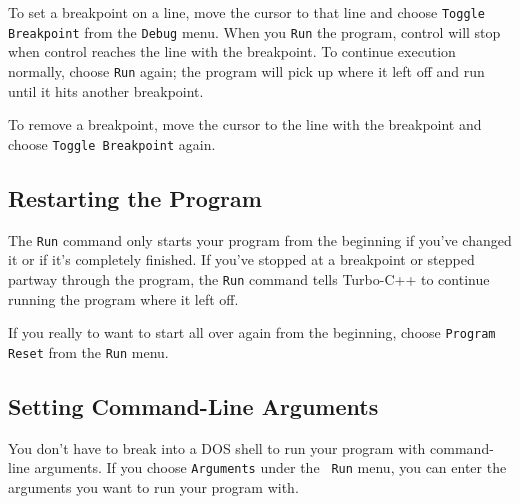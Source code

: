 To set a breakpoint on a line, move the cursor to that line and choose
{\tt Toggle Breakpoint} from the {\tt Debug} menu.  When you {\tt Run}
the program, control will stop when control reaches the line with the
breakpoint.  To continue execution normally, choose {\tt Run} again; the
program will pick up where it left off and run until it hits another
breakpoint.  

To remove a breakpoint, move the cursor to the line with the breakpoint
and choose {\tt Toggle Breakpoint} again.

\subsection{Restarting the Program}

The {\tt Run} command only starts your program from the beginning if
you've changed it or if it's completely finished.  If you've stopped at
a breakpoint or stepped partway through the program, the {\tt Run}
command tells Turbo-C++ to continue running the program where it left
off.   

If you really to want to start all over again from the beginning, choose
{\tt Program Reset} from the {\tt Run} menu.

\subsection{Setting Command-Line Arguments}

You don't have to break into a DOS shell to run your program with
command-line arguments.  If you choose {\tt Arguments} under the {\tt
Run} menu, you can enter the arguments you want to run your program with.
